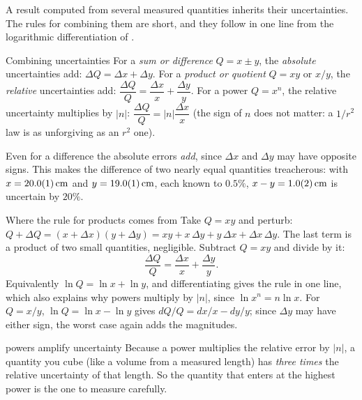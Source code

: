 A result computed from several measured quantities inherits their uncertainties. The rules for combining them
are short, and they follow in one line from the logarithmic differentiation of .

\begin{methodbox}{Combining uncertainties}
For a \emph{sum or difference} $Q=x\pm y$, the \emph{absolute} uncertainties add:
$\Delta Q=\Delta x+\Delta y$.
For a \emph{product or quotient} $Q=xy$ or $x/y$, the \emph{relative} uncertainties add:
$\dfrac{\Delta Q}{Q}=\dfrac{\Delta x}{x}+\dfrac{\Delta y}{y}$.
For a power $Q=x^n$, the relative uncertainty multiplies by $|n|$: $\dfrac{\Delta Q}{Q}=|n|\dfrac{\Delta x}{x}$
(the sign of $n$ does not matter: a $1/r^2$ law is as unforgiving as an $r^2$ one).
\end{methodbox}

Even for a difference the absolute errors \emph{add}, since $\Delta x$ and $\Delta y$ may have opposite
signs. This makes the difference of two nearly equal quantities treacherous: with $x=\SI{20.0 \pm 0.1}{cm}$
and $y=\SI{19.0 \pm 0.1}{cm}$, each known to $0.5\%$, $x-y=\SI{1.0 \pm 0.2}{cm}$ is uncertain by $20\%$.

\begin{derivbox}{Where the rule for products comes from}
Take $Q=xy$ and perturb: $Q+\Delta Q=(x+\Delta x)(y+\Delta y)=xy+x\,\Delta y+y\,\Delta x+\Delta x\,\Delta y$.
The last term is a product of two small quantities, negligible. Subtract $Q=xy$ and divide by it:
\[
\frac{\Delta Q}{Q}=\frac{\Delta x}{x}+\frac{\Delta y}{y}.
\]
Equivalently $\ln Q=\ln x+\ln y$, and differentiating gives the rule in one line, which also explains
why powers multiply by $|n|$, since $\ln x^n=n\ln x$. For $Q=x/y$, $\ln Q=\ln x-\ln y$ gives
$dQ/Q=dx/x-dy/y$; since $\Delta y$ may have either sign, the worst case again adds the magnitudes.
\end{derivbox}


\begin{trapbox}{powers amplify uncertainty}
Because a power multiplies the relative error by $|n|$, a quantity you cube (like a volume from a
measured length) has \emph{three times} the relative uncertainty of that length. So the quantity that
enters at the highest power is the one to measure carefully.
\end{trapbox}

